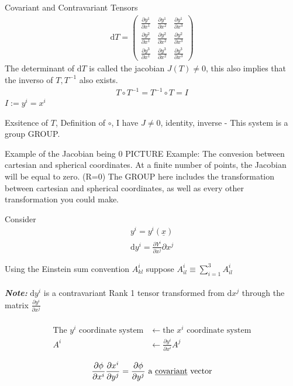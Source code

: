 \documentclass{article}
\renewcommand{\d}[0]{\mathrm{d}}
\newcommand{\note}[1]{\\\\\textit{\textbf{Note: }}#1\\\\}
\newcommand{\pOne}[2]{\frac{\partial #1}{\partial #2}}
\begin{document}
\begin{section}{Covariant and Contravariant Tensors}
      \begin{align*}
	\d T = \begin{pmatrix}
	  \pOne{y^1}{x^1} & \pOne{y^1}{x^2} & \pOne{y^1}{x^3}\\ 
	  \pOne{y^2}{x^1} & \pOne{y^2}{x^2} & \pOne{y^2}{x^3}\\ 
	  \pOne{y^3}{x^1} & \pOne{y^3}{x^2} & \pOne{y^3}{x^3}
	\end{pmatrix}
      \end{align*}
      The determinant of $\d T$ is called the jacobian $J(T)\neq 0$, this also implies that the inverso of $T,T^{-1}$ also exists. 
      \begin{align*}
	T\circ T^{-1} = T^{-1}\circ T = I
      \end{align*}
      $I := y^i = x^i$

      Exsitence of ${T}$, Definition of $\circ$, I have $J\neq 0$, identity, inverse - This system is a group GROUP.
      \begin{subsection}{Example of the Jacobian being 0}
	PICTURE
	Example: The convesion between cartesian and spherical coordinates. At a finite number of points, the Jacobian will be equal to zero. (R=0)
	The GROUP here includes the transformation between cartesian and spherical coordinates, as well as every other transformation you could make.
      \end{subsection}
    \end{section}
      \begin{section}{Consider}
				\begin{align*}y^i = y^i(\underline{x})\\
	  \d y^i = \pOne{Y^i}{x^j} \partial x^j
	\end{align*}

	Using the Einstein sum convention $A_{kl}^i$ suppose $A_{il}^i \equiv \sum_{i=1}^{3}A_{il}^i$
	\note{$\d y^i$ is a contravariant Rank 1 tensor transformed from $\d x^j$ through the matrix $\pOne{y^i}{x^j}$}
	\begin{align*}
		\text{The }y^i\text{ coordinate system} &\leftarrow  \text{the }x^i\text{ coordinate system}\\
		A^i  &\leftarrow \pOne{y^i}{x^i}A^j
	\end{align*}

	  \begin{align*}
			\pOne{\phi}{x^i}\pOne{x^i}{y^j} =\pOne{\phi}{y^j}\text{ a \underline{covariant} vector}
	  \end{align*}
	\end{section}
\end{document}
